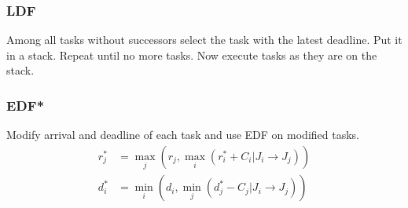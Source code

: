 \documentclass[a4paper,titlepage]{article}
\begin{document}
\subsubsection{LDF}
Among all tasks without successors select the task with the latest deadline. Put
it in a stack. Repeat until no more tasks. Now execute tasks as they are on the
stack.

\subsubsection{EDF*}
Modify arrival and deadline of each task and use EDF on modified tasks.
\begin{align*}
	r_j^* &= \max_{j}\left(r_j, \max_{i}\left(r_i^* + C_i | J_i \to J_j\right)\right) \\
	d_i^* &= \min_{i}\left(d_i, \min_{j}\left(d_j^* - C_j | J_i \to J_j\right)\right)
\end{align*}
\end{document}
